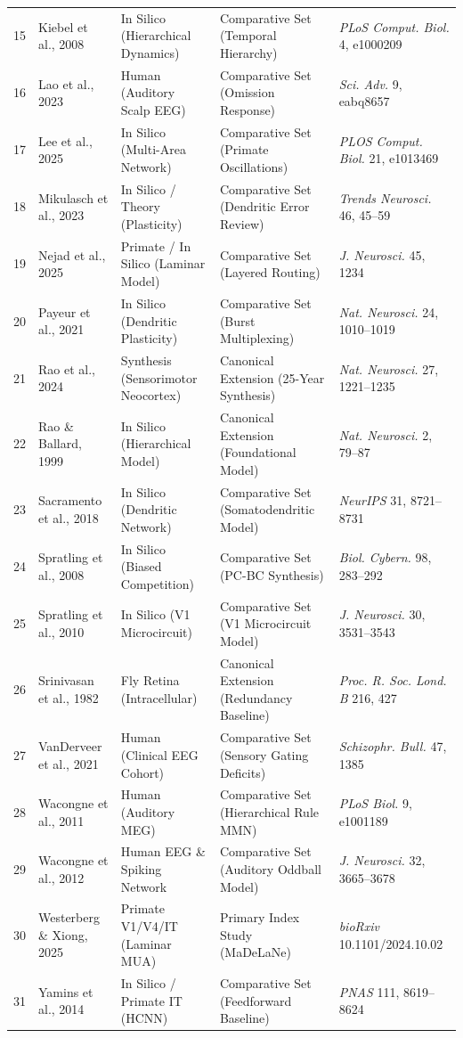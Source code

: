 \documentclass[12pt]{article}
\begin{document}
\begin{tabularx}{\textwidth}{@{}r l p{1.6in} p{1.6in} >{\raggedright\arraybackslash}X@{}}
15 & Kiebel et al., 2008 & In Silico (Hierarchical Dynamics) & Comparative Set (Temporal Hierarchy) & \emph{PLoS Comput. Biol.} 4, e1000209 \\
16 & Lao et al., 2023 & Human (Auditory Scalp EEG) & Comparative Set (Omission Response) & \emph{Sci. Adv.} 9, eabq8657 \\
17 & Lee et al., 2025 & In Silico (Multi-Area Network) & Comparative Set (Primate Oscillations) & \emph{PLOS Comput. Biol.} 21, e1013469 \\
18 & Mikulasch et al., 2023 & In Silico / Theory (Plasticity) & Comparative Set (Dendritic Error Review) & \emph{Trends Neurosci.} 46, 45--59 \\
19 & Nejad et al., 2025 & Primate / In Silico (Laminar Model) & Comparative Set (Layered Routing) & \emph{J. Neurosci.} 45, 1234 \\
20 & Payeur et al., 2021 & In Silico (Dendritic Plasticity) & Comparative Set (Burst Multiplexing) & \emph{Nat. Neurosci.} 24, 1010--1019 \\
21 & Rao et al., 2024 & Synthesis (Sensorimotor Neocortex) & Canonical Extension (25-Year Synthesis) & \emph{Nat. Neurosci.} 27, 1221--1235 \\
22 & Rao \& Ballard, 1999 & In Silico (Hierarchical Model) & Canonical Extension (Foundational Model) & \emph{Nat. Neurosci.} 2, 79--87 \\
23 & Sacramento et al., 2018 & In Silico (Dendritic Network) & Comparative Set (Somatodendritic Model) & \emph{NeurIPS} 31, 8721--8731 \\
24 & Spratling et al., 2008 & In Silico (Biased Competition) & Comparative Set (PC-BC Synthesis) & \emph{Biol. Cybern.} 98, 283--292 \\
25 & Spratling et al., 2010 & In Silico (V1 Microcircuit) & Comparative Set (V1 Microcircuit Model) & \emph{J. Neurosci.} 30, 3531--3543 \\
26 & Srinivasan et al., 1982 & Fly Retina (Intracellular) & Canonical Extension (Redundancy Baseline) & \emph{Proc. R. Soc. Lond. B} 216, 427 \\
27 & VanDerveer et al., 2021 & Human (Clinical EEG Cohort) & Comparative Set (Sensory Gating Deficits) & \emph{Schizophr. Bull.} 47, 1385 \\
28 & Wacongne et al., 2011 & Human (Auditory MEG) & Comparative Set (Hierarchical Rule MMN) & \emph{PLoS Biol.} 9, e1001189 \\
29 & Wacongne et al., 2012 & Human EEG \& Spiking Network & Comparative Set (Auditory Oddball Model) & \emph{J. Neurosci.} 32, 3665--3678 \\
30 & Westerberg \& Xiong, 2025 & Primate V1/V4/IT (Laminar MUA) & Primary Index Study (MaDeLaNe) & \emph{bioRxiv} 10.1101/2024.10.02 \\
31 & Yamins et al., 2014 & In Silico / Primate IT (HCNN) & Comparative Set (Feedforward Baseline) & \emph{PNAS} 111, 8619--8624 \\
\bottomrule
\end{tabularx}
\endgroup
\vspace{0.4em}
\end{document}
